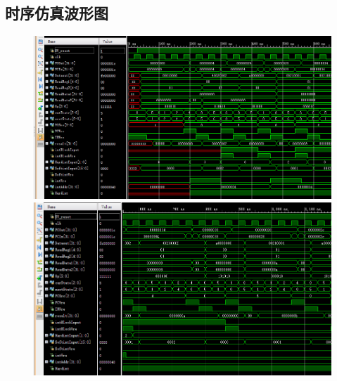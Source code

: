 \documentclass{article}
\begin{document}
\newpage
\appendix
\appendixpage
{}
\begin{appendices}
\section{时序仿真波形图}

\begin{figure}[!h]
\centering
\includegraphics[scale=0.45]{../pics/img_1.png}
\includegraphics[scale=0.48]{../pics/img_2.png}
\end{figure}

\newpage


\end{appendices}
\end{document}
